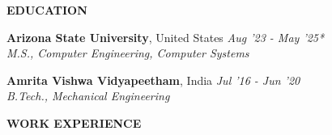\documentclass[10pt,a4]{article}
\def\hrulefill{\leavevmode\leaders\hrule height 1pt\hfill\kern 0pt}		%
\begin{document}
{%
	



	
	\begin{flushleft}
	{\Large \textbf{EDUCATION}} %
		
		\vspace{1.5mm}

	\textbf{\large Arizona State University}, \large United States \tab  \hfill \textit{\large Aug '23 - May '25*}	\\
        \hspace{0.5cm} \textit{\large M.S., Computer Engineering, Computer Systems}	\\
		


    \vspace{1mm}

    
    \textbf{\large Amrita Vishwa Vidyapeetham}, \large India \tab  \hfill \textit{\large Jul '16 - Jun '20}	\\
        \hspace{0.5 cm}\textit{\large B.Tech., Mechanical Engineering}

		
	\end{flushleft}
		
		
		
\begin{flushleft}
		{\Large \textbf{WORK EXPERIENCE}} %
  

\end{flushleft}}
\end{document}
